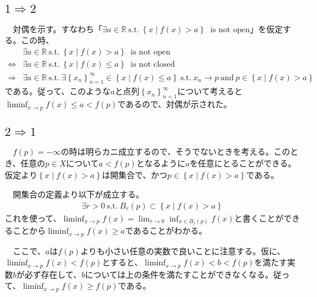 \documentclass{article}
\begin{document}
\subsection{$1\Rightarrow 2$}
　対偶を示す。すなわち「$\exists a\in \mathbb{R}\ \text{s.t.}\ \left\{ x\mid f(x) > a \right\}\ \text{\ is not open}$」を仮定する。この時、
\begin{align*}
&\exists a\in \mathbb{R}\ \text{s.t.}\ \left\{ x\mid f(x) > a \right\}\ \text{\ is not open}\\
\Leftrightarrow
&\exists a\in \mathbb{R}\ \text{s.t.}\ \left\{ x\mid f(x) \leq a \right\}\ \text{\ is not closed}\\
\Rightarrow
&\exists a\in \mathbb{R}\ \text{s.t.}\  \exists \left\{ x_n \right\}_{n=1}^{\infty} \in \left\{x\mid f(x) \leq a \right\}\ \text{s.t.}\ x_n \to p\ \text{and}\ p\in \left\{x\mid f(x) > a \right\}
\end{align*}
である。従って、このような$a$と点列$\left\{ x_n \right\}_{n=1}^{\infty}$について考えると$\liminf_{x\to p} f(x) \leq a < f(p)$であるので、対偶が示された。


\subsection{$2\Rightarrow 1$}
　$f(p) = -\infty$の時は明らカニ成立するので、そうでないときを考える。このとき、任意の$p\in X$について$a < f(p)$となるように$a$を任意にとることができる。仮定より$\left\{ x\mid f(x) > a \right\}$は開集合で、かつ$p \in \left\{ x\mid f(x) > a \right\}$である。

　開集合の定義より以下が成立する。
\begin{align*}
	\exists r>0\ \text{s.t.}\ B_{r}(p) \subset \left\{ x\mid f(x) > a \right\}
\end{align*}
これを使って、$\liminf_{x\to p} f(x) = \lim_{r\to 0} \inf_{x\in B_{r}(p)} f(x)$と書くことができることから$\liminf_{x\to p} f(x) \geq a$であることがわかる。

　ここで、$a$は$f(p)$よりも小さい任意の実数で良いことに注意する。仮に、$\liminf_{x\to p} f(x) < f(p)$とすると、$\liminf_{x\to p} f(x) < b < f(p)$を満たす実数$b$が必ず存在して、$b$については上の条件を満たすことができなくなる。従って、$\liminf_{x\to p} f(x) \geq f(p)$である。
\end{document}
